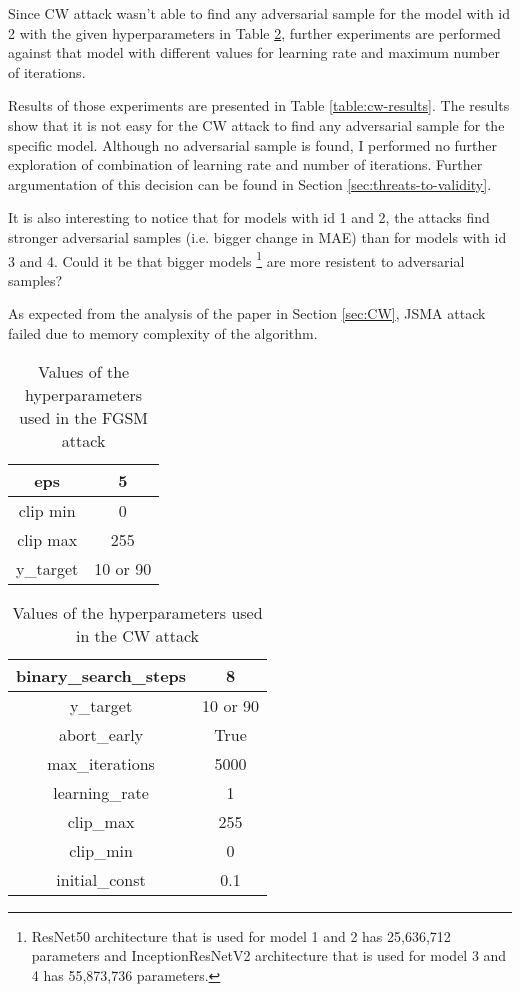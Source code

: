 Since CW attack wasn't able to find any adversarial sample for the model with id 2 with the given hyperparameters in Table \ref{table:cw-params}, further experiments are performed against that model with different values for learning rate and maximum number of iterations.

Results of those experiments are presented in Table \ref{table:cw-results}. The results show that it is not easy for the CW attack to find any adversarial sample for the specific model. Although no adversarial sample is found, I performed no further exploration of combination of learning rate and number of iterations. Further argumentation of this decision can be found in Section \ref{sec:threats-to-validity}.

It is also interesting to notice that for models with id 1 and 2, the attacks find stronger adversarial samples (i.e. bigger change in MAE) than for models with id 3 and 4. Could it be that bigger models \footnote{ResNet50 architecture that is used for model 1 and 2 has 25,636,712 parameters and InceptionResNetV2  architecture that is used for model 3 and 4 has 55,873,736 parameters.} are more resistent to adversarial samples? 

As expected from the analysis of the paper \cite{DBLP:journals/corr/CarliniW16a} in Section \ref{sec:CW}, JSMA attack failed due to memory complexity of the algorithm.

\begin{table}[]
\centering
\begin{tabular}{|c|c|}
\hline
eps & 5 \\  \hline
clip min & 0  \\ \hline
clip max & 255 \\ \hline
y\_target & 10 or 90 \\ \hline
\end{tabular}
\caption{Values of the hyperparameters used in the FGSM attack}
\label{table:fgsm-params}
\end{table}

\begin{table}[]
\centering
\begin{tabular}{|c|c|}
\hline
binary\_search\_steps & 8 \\ \hline
y\_target & 10 or 90 \\ \hline
abort\_early & True \\ \hline
max\_iterations & 5000 \\ \hline
learning\_rate & 1 \\ \hline
clip\_max & 255 \\ \hline
clip\_min & 0 \\ \hline
initial\_const & 0.1 \\ \hline
\end{tabular}
\caption{Values of the hyperparameters  used in the CW attack}
\label{table:cw-params}
\end{table}

